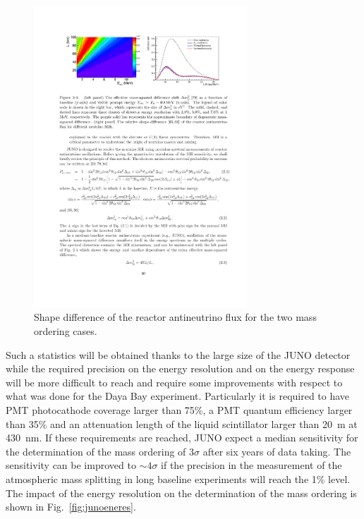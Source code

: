\begin{figure} [h!]
\begin{center}
\includegraphics[width=8cm]{figures/JUNO_spectrum.pdf}
\caption{\label{fig:junospectrum} Shape difference of the reactor antineutrino flux for the two mass ordering cases.}
\end{center}
\end{figure}

Such a statistics will be obtained thanks to the large size of the JUNO detector while the required precision on the energy resolution and on the energy response will be more difficult to reach and require some improvements with respect to what was done for the Daya Bay experiment. Particularly it is required to have PMT photocathode coverage larger than 75\%, a PMT quantum efficiency larger than 35\% and an attenuation length of the liquid scintillator larger than 20~m at 430~nm. If these requirements are reached, JUNO expect a median sensitivity for the determination of the mass ordering of $3\sigma$ after six years of data taking. The sensitivity can be improved to $\sim4\sigma$ if the precision in the measurement of the atmospheric mass splitting in long baseline experiments will reach the 1\% level.
The impact of the energy resolution on the determination of the mass ordering is shown in Fig.~\ref{fig:junoeneres}.

